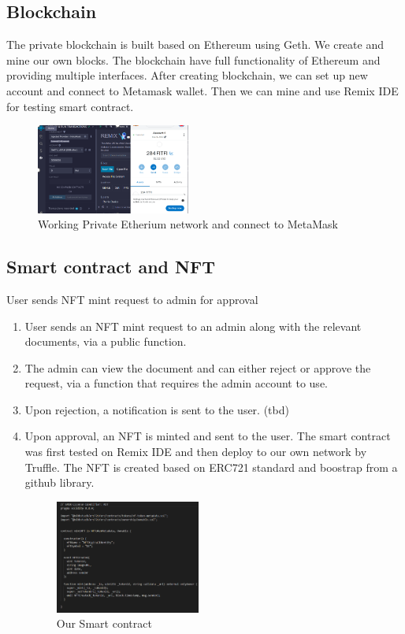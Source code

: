 \documentclass[conference]{IEEEtran}
\begin{document}
\subsection{Blockchain}
The private blockchain is built based on Ethereum using Geth. We create and mine our own blocks. The blockchain have full functionality of Ethereum and providing multiple interfaces.
After creating blockchain, we can set up new account and connect to Metamask wallet. Then we can mine and use Remix IDE for testing smart contract.
\begin{figure}[ht]
\centerline{\includegraphics[width=0.45\textwidth]{Etherium.png}}
\caption{Working Private Etherium network and connect to MetaMask}
\label{fig1}
\end{figure}


\subsection{Smart contract and NFT}
User sends NFT mint request to admin for approval
\begin{enumerate}
  \item User sends an NFT mint request to an admin along with the relevant documents, via a public function.
  \item The admin can view the document and can either reject or approve the request, via a function that requires the admin account to use.
  \item Upon rejection, a notification is sent to the user. (tbd)
  \item Upon approval, an NFT is minted and sent to the user.
The smart contract was first tested on Remix IDE and then deploy to our own network by Truffle. 
The NFT is created based on ERC721 standard and boostrap from a github library. 
\begin{figure}[ht]
\centerline{\includegraphics[width=0.45\textwidth]{Smartcontract.png}}
\caption{Our Smart contract}
\label{fig2}
\end{figure}
\end{enumerate}
\end{document}

